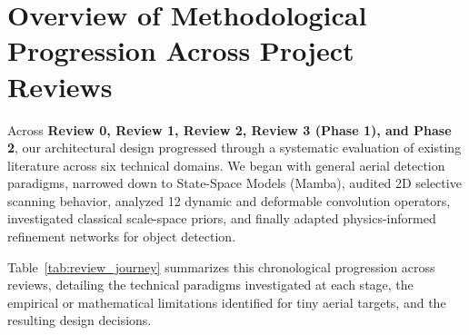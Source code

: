 \documentclass[11pt,a4paper]{article}
\begin{document}
\section{Overview of Methodological Progression Across Project Reviews}

Across \textbf{Review 0, Review 1, Review 2, Review 3 (Phase 1), and Phase 2}, our architectural design progressed through a systematic evaluation of existing literature across six technical domains. We began with general aerial detection paradigms, narrowed down to State-Space Models (Mamba), audited 2D selective scanning behavior, analyzed 12 dynamic and deformable convolution operators, investigated classical scale-space priors, and finally adapted physics-informed refinement networks for object detection.

Table~\ref{tab:review_journey} summarizes this chronological progression across reviews, detailing the technical paradigms investigated at each stage, the empirical or mathematical limitations identified for tiny aerial targets, and the resulting design decisions.
\end{document}
